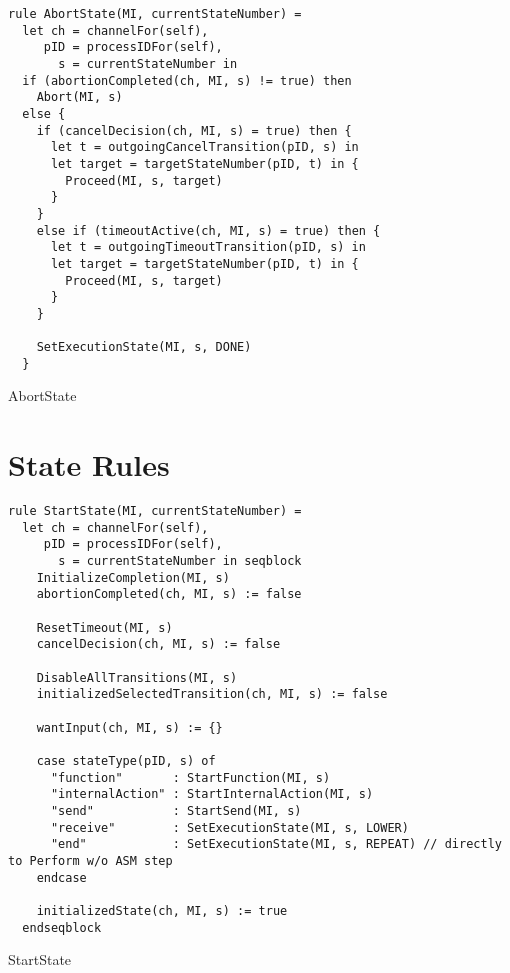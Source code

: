 \begin{listing}[H]
\begin{verbatim}
rule AbortState(MI, currentStateNumber) =
  let ch = channelFor(self),
     pID = processIDFor(self),
       s = currentStateNumber in
  if (abortionCompleted(ch, MI, s) != true) then
    Abort(MI, s)
  else {
    if (cancelDecision(ch, MI, s) = true) then {
      let t = outgoingCancelTransition(pID, s) in
      let target = targetStateNumber(pID, t) in {
        Proceed(MI, s, target)
      }
    }
    else if (timeoutActive(ch, MI, s) = true) then {
      let t = outgoingTimeoutTransition(pID, s) in
      let target = targetStateNumber(pID, t) in {
        Proceed(MI, s, target)
      }
    }

    SetExecutionState(MI, s, DONE)
  }
\end{verbatim}
\caption{AbortState}
\label{lst:asm:AbortState}
\end{listing}



\section{State Rules}

\begin{listing}[H]
\begin{verbatim}
rule StartState(MI, currentStateNumber) =
  let ch = channelFor(self),
     pID = processIDFor(self),
       s = currentStateNumber in seqblock
    InitializeCompletion(MI, s)
    abortionCompleted(ch, MI, s) := false

    ResetTimeout(MI, s)
    cancelDecision(ch, MI, s) := false

    DisableAllTransitions(MI, s)
    initializedSelectedTransition(ch, MI, s) := false

    wantInput(ch, MI, s) := {}

    case stateType(pID, s) of
      "function"       : StartFunction(MI, s)
      "internalAction" : StartInternalAction(MI, s)
      "send"           : StartSend(MI, s)
      "receive"        : SetExecutionState(MI, s, LOWER)
      "end"            : SetExecutionState(MI, s, REPEAT) // directly to Perform w/o ASM step
    endcase

    initializedState(ch, MI, s) := true
  endseqblock
\end{verbatim}
\caption{StartState}
\label{lst:asm:StartState}
\end{listing}




